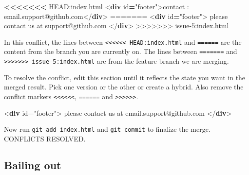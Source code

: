 \documentclass[
]{book}
\newenvironment{Shaded}{\begin{snugshade}}{\end{snugshade}}
\newcommand{\DataTypeTok}[1]{\textcolor[rgb]{0.13,0.29,0.53}{#1}}
\newcommand{\ErrorTok}[1]{\textcolor[rgb]{0.64,0.00,0.00}{\textbf{#1}}}
\newcommand{\KeywordTok}[1]{\textcolor[rgb]{0.13,0.29,0.53}{\textbf{#1}}}
\newcommand{\NormalTok}[1]{#1}
\newcommand{\OperatorTok}[1]{\textcolor[rgb]{0.81,0.36,0.00}{\textbf{#1}}}
\newcommand{\OtherTok}[1]{\textcolor[rgb]{0.56,0.35,0.01}{#1}}
\newcommand{\StringTok}[1]{\textcolor[rgb]{0.31,0.60,0.02}{#1}}
\begin{document}
\begin{Shaded}
\begin{Highlighting}[]
\ErrorTok{\textless{}\textless{}\textless{}\textless{}\textless{}\textless{}\textless{}}\NormalTok{ HEAD:index.html}
\DataTypeTok{\textless{}}\KeywordTok{div}\OtherTok{ id}\OperatorTok{=}\StringTok{"footer"}\DataTypeTok{\textgreater{}}\NormalTok{contact : email.support@github.com}\DataTypeTok{\textless{}/}\KeywordTok{div}\DataTypeTok{\textgreater{}}
\NormalTok{=======}
\DataTypeTok{\textless{}}\KeywordTok{div}\OtherTok{ id}\OperatorTok{=}\StringTok{"footer"}\DataTypeTok{\textgreater{}}
\NormalTok{ please contact us at support@github.com}
\DataTypeTok{\textless{}/}\KeywordTok{div}\DataTypeTok{\textgreater{}}
\NormalTok{\textgreater{}\textgreater{}\textgreater{}\textgreater{}\textgreater{}\textgreater{}\textgreater{} issue{-}5:index.html}
\end{Highlighting}
\end{Shaded}

In this conflict, the lines between \texttt{\textless{}\textless{}\textless{}\textless{}\textless{}\textless{}\ HEAD:index.html} and \texttt{======} are
the content from the branch you are currently on.
The lines between \texttt{=======} and \texttt{\textgreater{}\textgreater{}\textgreater{}\textgreater{}\textgreater{}\textgreater{}\textgreater{}\ issue-5:index.html} are from the feature branch we are merging.

To resolve the conflict, edit this section until it reflects the state you want in the merged result.
Pick one version or the other or create a hybrid.
Also remove the conflict markers \texttt{\textless{}\textless{}\textless{}\textless{}\textless{}\textless{}}, \texttt{======} and \texttt{\textgreater{}\textgreater{}\textgreater{}\textgreater{}\textgreater{}\textgreater{}}.

\begin{Shaded}
\begin{Highlighting}[]
\DataTypeTok{\textless{}}\KeywordTok{div}\OtherTok{ id}\OperatorTok{=}\StringTok{"footer"}\DataTypeTok{\textgreater{}}
\NormalTok{please contact us at email.support@github.com}
\DataTypeTok{\textless{}/}\KeywordTok{div}\DataTypeTok{\textgreater{}}
\end{Highlighting}
\end{Shaded}

Now run \texttt{git\ add\ index.html} and \texttt{git\ commit} to finalize the merge.
CONFLICTS RESOLVED.

\subsection{Bailing out}\label{bailing-out}
\end{document}
